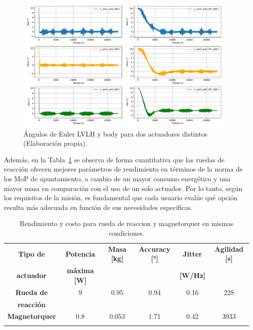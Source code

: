 \begin{figure}[H]
	\centering    
	\includegraphics[width=0.97\textwidth]{MT_RW_nivel2.pdf}
	\caption{Ángulos de Euler LVLH y body para dos actuadores distintos (Elaboración propia).}
	\label{fig:MT_RW_nivel2}
\end{figure}

Además, en la Tabla~\ref{tab:RW_MT_nivel2} se observa de forma cuantitativa que las ruedas de reacción ofrecen mejores parámetros de rendimiento en términos de la norma de los MoP de apuntamiento, a cambio de un mayor consumo energético y una mayor masa en comparación con el uso de un solo actuador. Por lo tanto, según los requisitos de la misión, es fundamental que cada usuario evalúe qué opción resulta más adecuada en función de sus necesidades específicas.

\begin{table}[h!]
	\centering
	\caption{Rendimiento y costo para rueda de reaccion y magnetorquer en mismas condiciones.}
	\begin{tabular}{|c|c|c|c|c|c|}
		\hline
		\textbf{Tipo de}   & \textbf{Potencia} & \textbf{Masa [kg]} & \textbf{Accuracy [°]} & \textbf{Jitter} & \textbf{Agilidad [s]}  \\ 
		\textbf{actuador}   & \textbf{máxima [W]} & & & \textbf{[W/Hz]} &  \\
		\hline
		\textbf{Rueda de}   & 9  & 0.95  & 0.94 & 0.16 & 228   \\
		\textbf{reacción}   &  &   &  &  &    \\
		\hline
		\textbf{Magnetorquer}   & 0.8  & 0.053  & 1.71 & 0.42 & 3933   \\
		& & & & &   \\
		\hline
	\end{tabular}
	\label{tab:RW_MT_nivel2}
\end{table}


